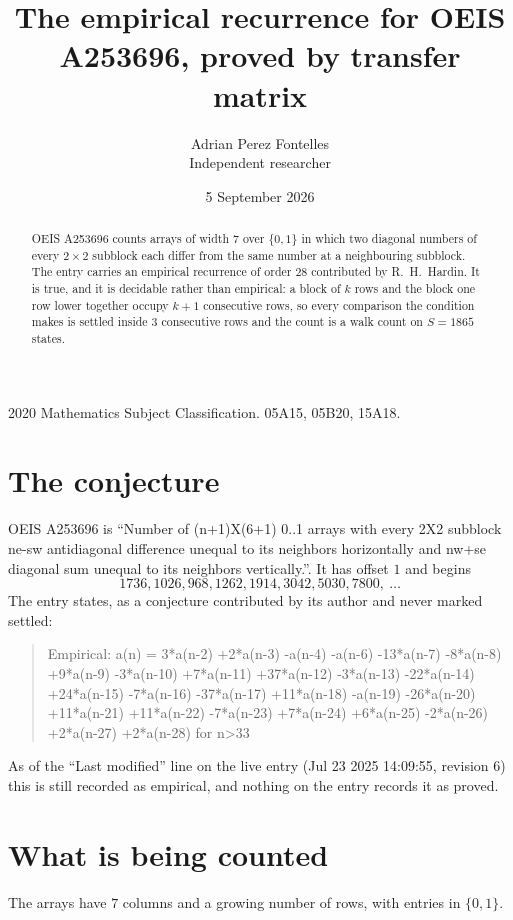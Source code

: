 \documentclass[11pt,a4paper]{article}
\title{The empirical recurrence for OEIS A253696, proved by transfer matrix}
\author{Adrian Perez Fontelles\\ \small Independent researcher}
\date{5 September 2026}
\theoremstyle{plain}
\theoremstyle{definition}
\begin{document}
\maketitle

\begin{abstract}
OEIS A253696 counts arrays of width $7$ over $\{0,1\}$ in which two diagonal numbers of every $2\times2$ subblock each differ from the same number at a neighbouring subblock. The entry carries an
empirical recurrence of order $28$ contributed by R.~H.~Hardin. It is true, and it is
decidable rather than empirical: a block of $k$ rows and the block one row lower together
occupy $k+1$ consecutive rows, so every comparison the condition makes is settled inside
$3$ consecutive rows and the count is a walk count on $S=1865$ states.
\end{abstract}

\noindent\small 2020 Mathematics Subject Classification. 05A15, 05B20, 15A18.\normalsize

\section{The conjecture}

OEIS A253696 is ``Number of (n+1)X(6+1) 0..1 arrays with every 2X2 subblock ne-sw antidiagonal difference unequal to its neighbors horizontally and nw+se diagonal sum unequal to its neighbors vertically.''. It has offset $1$ and begins
\[
1736, 1026, 968, 1262, 1914, 3042, 5030, 7800,\ \dots
\]
The entry states, as a conjecture contributed by its author and never marked settled:
\begin{quote}
Empirical: a(n) = 3*a(n-2) +2*a(n-3) -a(n-4) -a(n-6) -13*a(n-7) -8*a(n-8) +9*a(n-9) -3*a(n-10) +7*a(n-11) +37*a(n-12) -3*a(n-13) -22*a(n-14) +24*a(n-15) -7*a(n-16) -37*a(n-17) +11*a(n-18) -a(n-19) -26*a(n-20) +11*a(n-21) +11*a(n-22) -7*a(n-23) +7*a(n-24) +6*a(n-25) -2*a(n-26) +2*a(n-27) +2*a(n-28) for n>33
\end{quote}
As of the ``Last modified'' line on the live entry (Jul 23 2025 14:09:55, revision 6) this is still
recorded as empirical, and nothing on the entry records it as proved.

\section{What is being counted}

The arrays have $7$ columns and a growing number of rows, with entries in $\{0,1\}$.
\end{document}
